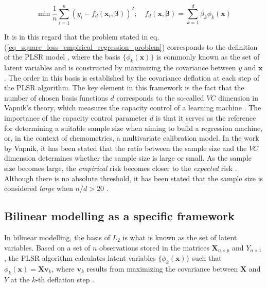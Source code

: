\documentclass[journal=ancham,manuscript=article]{achemso}
\begin{document}
\begin{equation}
    \min \frac{1}{n} \sum_{i=1}^n (y_i-f_d(\mathbf{x}_i, \boldsymbol{\beta}))^2; \quad f_d(\mathbf{x}, \boldsymbol{\beta}) = \sum_{k=1}^{d} \beta_k \phi_{k}(\mathbf{x})
    \label{eq_square_loss_empirical_regression_problem}
\end{equation}

It is in this regard that the problem stated in eq. (\ref{eq_square_loss_empirical_regression_problem}) corresponds to the definition of the PLSR model  \cite{Stone1990}, where the basis $\{\phi_{k}(\mathbf{x})\}$ is commonly known as the set of latent variables and is constructed by maximizing the covariance between $y$ and $\mathbf{x}$. The order in this basis is established by the covariance deflation at each step of the PLSR algorithm. The key element in this framework is the fact that the number of chosen basis functions $d$ corresponds to the so-called $VC$ dimension in Vapnik's theory, which measures the capacity control of a learning machine \cite{Vapnik2019}. The importance of the capacity control parameter $d$ is that it serves as the reference for determining a suitable sample size when aiming to build a regression machine, or, in the context of chemometrics, a multivariate calibration model. In the work by Vapnik, it has been stated that the ratio between the sample size and the $VC$ dimension determines whether the sample size is large or small. As the sample size becomes large, the \emph{empirical} risk becomes closer to the \emph{expected} risk \cite{Vapnik2000}. Although there is no absolute threshold, it has been stated that the sample size is considered \emph{large} when  $n/d>20$ \cite{Vapnik2000}.


\subsection{Bilinear modelling as a specific framework}

In bilinear modelling, the basis of $L_2$ is what is known as the set of latent variables. Based on a set of $n$ observations stored in the matrices $\mathbf{X}_{n\times p}$ and $Y_{n\times 1}$, the PLSR algorithm calculates latent variables $\{\phi_{k}(\mathbf{x})\}$ such that $\phi_k(\mathbf{x}) = \mathbf{Xv}_{k}$, where $\mathbf{v}_k$ results from maximizing the covariance between $\mathbf{X}$ and $Y$ at the $k$-th deflation step \cite{DeJong1993}. 
\end{document}
